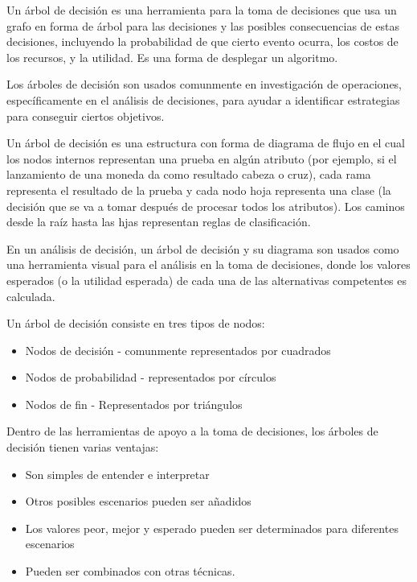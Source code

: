 Un árbol de decisión es una herramienta para la toma de decisiones que
usa un grafo en forma de árbol para las decisiones y las posibles
consecuencias de estas decisiones, incluyendo la probabilidad de que
cierto evento ocurra, los costos de los recursos, y la utilidad. Es
una forma de desplegar un algoritmo.

Los árboles de decisión son usados comunmente en investigación de
operaciones, específicamente en el análisis de decisiones, para ayudar
a identificar estrategias para conseguir ciertos objetivos.

Un árbol de decisión es una estructura con forma de diagrama de flujo
en el cual los nodos internos representan una prueba en algún atributo
(por ejemplo, si el lanzamiento de una moneda da como resultado cabeza
o cruz), cada rama representa el resultado de la prueba y cada nodo
hoja representa una clase (la decisión que se va a tomar después de
procesar todos los atributos). Los caminos desde la raíz hasta las
hjas representan reglas de clasificación.

En un análisis de decisión, un árbol de decisión y su diagrama son
usados como una herramienta visual para el análisis en la toma de
decisiones, donde los valores esperados (o la utilidad esperada) de
cada una de las alternativas competentes es calculada.

Un árbol de decisión consiste en tres tipos de nodos:

\begin{itemize}
  \item Nodos de decisión - comunmente representados por cuadrados
  \item Nodos de probabilidad - representados por círculos
  \item Nodos de fin - Representados por triángulos
\end{itemize}

Dentro de las herramientas de apoyo a la toma de decisiones, los
árboles de decisión tienen varias ventajas:

\begin{itemize}
  \item Son simples de entender e interpretar
  \item Otros posibles escenarios pueden ser añadidos
  \item Los valores peor, mejor y esperado pueden ser determinados
    para diferentes escenarios
  \item Pueden ser combinados con otras técnicas.
\end{itemize}

